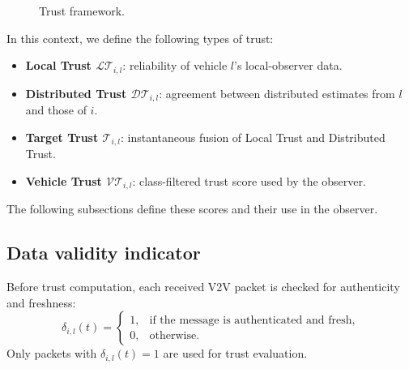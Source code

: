 \documentclass[journal,twoside]{IEEEtran}
\def\LT{\mathcal{LT}} %
\def\DT{\mathcal{DT}} %
\def\VT{\mathcal{VT}} %
\def\T{\mathcal{T}} %
\begin{document}
\begin{figure}[!ht]
    \caption{Trust framework.}
    \label{fig_trust_framework}
\end{figure}

In this context, we define the following types of trust:
\begin{itemize}
    \item \textbf{Local Trust $\LT_{i,l}$}: reliability of vehicle $l$'s local-observer data.
    \item \textbf{Distributed Trust $\DT_{i,l}$}: agreement between distributed estimates from $l$ and those of $i$.
    \item \textbf{Target Trust $\T_{i,l}$}: instantaneous fusion of Local Trust and Distributed Trust.
    \item \textbf{Vehicle Trust $\VT_{i,l}$}: class-filtered trust score used by the observer.
\end{itemize}

The following subsections define these scores and their use in the observer.
\subsection{Data validity indicator}

Before trust computation, each received V2V packet is checked for authenticity and freshness:
{\small
\begin{equation}
    \delta_{i,l}(t)=
    \begin{cases}
        1, & \text{if the message is authenticated and fresh}, \\
        0, & \text{otherwise.}
    \end{cases}
\end{equation}
}
Only packets with $\delta_{i,l}(t)=1$ are used for trust evaluation.
\end{document}

